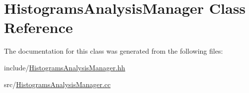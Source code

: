\hypertarget{classHistogramsAnalysisManager}{}\section{Histograms\+Analysis\+Manager Class Reference}
\label{classHistogramsAnalysisManager}


The documentation for this class was generated from the following files\+:\begin{DoxyCompactItemize}
\item 
include/\hyperlink{HistogramsAnalysisManager_8hh}{Histograms\+Analysis\+Manager.\+hh}\item 
src/\hyperlink{HistogramsAnalysisManager_8cc}{Histograms\+Analysis\+Manager.\+cc}\end{DoxyCompactItemize}
